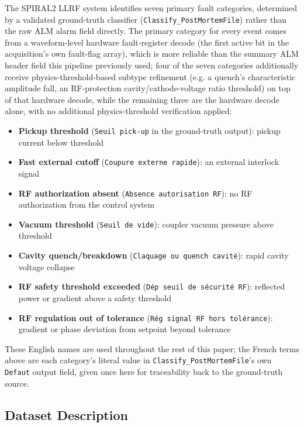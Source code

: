 The SPIRAL2 LLRF system identifies seven primary fault categories, determined by a validated ground-truth classifier (\texttt{Classify\_PostMortemFile}) rather than the raw ALM alarm field directly. The primary category for every event comes from a waveform-level hardware fault-register decode (the first active bit in the acquisition's own fault-flag array), which is more reliable than the summary ALM header field this pipeline previously used; four of the seven categories additionally receive physics-threshold-based subtype refinement (e.g. a quench's characteristic amplitude fall, an RF-protection cavity/cathode-voltage ratio threshold) on top of that hardware decode, while the remaining three are the hardware decode alone, with no additional physics-threshold verification applied:

\begin{itemize}
    \item \textbf{Pickup threshold} (\texttt{Seuil pick-up} in the ground-truth output): pickup current below threshold
    \item \textbf{Fast external cutoff} (\texttt{Coupure externe rapide}): an external interlock signal
    \item \textbf{RF authorization absent} (\texttt{Absence autorisation RF}): no RF authorization from the control system
    \item \textbf{Vacuum threshold} (\texttt{Seuil de vide}): coupler vacuum pressure above threshold
    \item \textbf{Cavity quench/breakdown} (\texttt{Claquage ou quench cavité}): rapid cavity voltage collapse
    \item \textbf{RF safety threshold exceeded} (\texttt{Dép seuil de sécurité RF}): reflected power or gradient above a safety threshold
    \item \textbf{RF regulation out of tolerance} (\texttt{Rég signal RF hors tolérance}): gradient or phase deviation from setpoint beyond tolerance
\end{itemize}
These English names are used throughout the rest of this paper; the French terms above are each category's literal value in \texttt{Classify\_PostMortemFile}'s own \texttt{Defaut} output field, given once here for traceability back to the ground-truth source. %

\subsection{Dataset Description}


